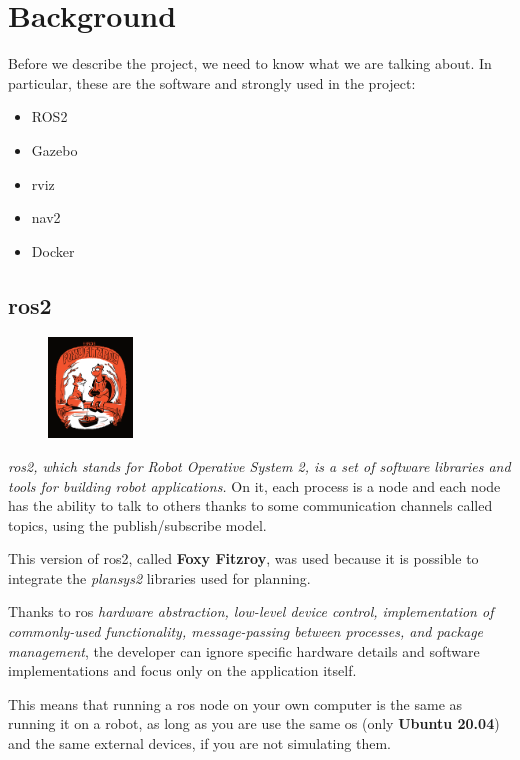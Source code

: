 \chapter{Background}
\label{cha:techstack}

Before we describe the project, we need to know what we are talking about. In particular, these are the software and strongly used in the project:  
\begin{itemize}
    \item ROS2
    \item Gazebo
    \item \acrfull{rviz}
    \item \acrfull{nav2}
    \item Docker
\end{itemize}

\section{\acrshort{ros}2}

\begin{figure}
    \includegraphics[width=0.2\textwidth]{images/foxy}
\end{figure}

\textit{\acrshort{ros}2, which stands for Robot Operative System 2, is a set of software libraries and tools for building robot applications.}\cite{ros2desc} On it, each process is a node and each node has the ability to talk to others thanks to some communication channels called topics, using the publish/subscribe model.

This version of \acrshort{ros}2, called \textbf{Foxy Fitzroy}, was used because it is possible to integrate the \textit{plansys2} libraries used for planning.

Thanks to \acrshort{ros} \textit{hardware abstraction, low-level device control, implementation of commonly-used functionality, message-passing between processes, and package management}\cite{ros2help}, the developer can ignore specific hardware details and software implementations and focus only on the application itself. 

This means that running a \acrshort{ros} node on your own computer is the same as running it on a robot, as long as you are use the same \acrfull{os} (only \textbf{Ubuntu 20.04}) and the same external devices, if you are not simulating them.

